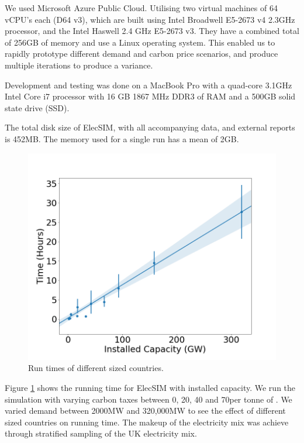  We used Microsoft Azure Public Cloud. Utilising two virtual machines of 64 vCPU's each (D64 v3), which are built using Intel Broadwell E5-2673 v4 2.3GHz processor, and the Intel Haswell 2.4 GHz E5-2673 v3. They have a combined total of 256GB of memory and use a Linux operating system. This enabled us to rapidly prototype different demand and carbon price scenarios, and produce multiple iterations to produce a variance.

Development and testing was done on a MacBook Pro with a quad-core 3.1GHz Intel Core i7 processor with 16 GB 1867 MHz DDR3 of RAM and a 500GB solid state drive (SSD).

The total disk size of ElecSIM, with all accompanying data, and external reports is 452MB. The memory used for a single run has a mean of 2GB.



\begin{figure}[h]
	\centering
	\includegraphics[width=1\linewidth]{figures/timing_plot}
	\caption{Run times of different sized countries.}
	\label{fig:timingplot}
\end{figure}

Figure \ref{fig:timingplot} shows the running time for ElecSIM with installed capacity. We run the simulation with varying carbon taxes between 0, 20, 40 and 70\textsterling per tonne of . We varied demand between 2000MW and 320,000MW to see the effect of different sized countries on running time. The makeup of the electricity mix was achieve through stratified sampling of the UK electricity mix. 

